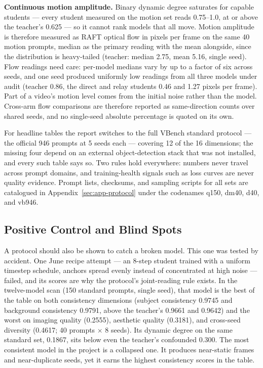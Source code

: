 \documentclass[11pt,a4paper]{article}
\begin{document}
\textbf{Continuous motion amplitude.} Binary dynamic degree saturates for capable students — every student measured on the motion set reads 0.75–1.0, at or above the teacher's 0.625 — so it cannot rank models that all move. Motion amplitude is therefore measured as RAFT optical flow \cite{raft} in pixels per frame on the same 40 motion prompts, median as the primary reading with the mean alongside, since the distribution is heavy-tailed (teacher: median 2.75, mean 5.16, single seed). Flow readings need care: per-model medians vary by up to a factor of six across seeds, and one seed produced uniformly low readings from all three models under audit (teacher 0.86, the direct and relay students 0.46 and 1.27 pixels per frame). Part of a video's motion level comes from the initial noise rather than the model. Cross-arm flow comparisons are therefore reported as same-direction counts over shared seeds, and no single-seed absolute percentage is quoted on its own.

For headline tables the report switches to the full VBench standard protocol — the official 946 prompts at 5 seeds each — covering 12 of the 16 dimensions; the missing four depend on an external object-detection stack that was not installed, and every such table says so. Two rules hold everywhere: numbers never travel across prompt domains, and training-health signals such as loss curves are never quality evidence. Prompt lists, checksums, and sampling scripts for all sets are catalogued in Appendix~\ref{sec:app-protocol} under the codenames q150, dm40, d40, and vb946.

\subsection{Positive Control and Blind Spots}\label{sec:protocol-control}

A protocol should also be shown to catch a broken model. This one was tested by accident. One June recipe attempt — an 8-step student trained with a uniform timestep schedule, anchors spread evenly instead of concentrated at high noise — failed, and its scores are why the protocol's joint-reading rule exists. In the twelve-model scan (150 standard prompts, single seed), that model is the best of the table on both consistency dimensions (subject consistency 0.9745 and background consistency 0.9791, above the teacher's 0.9661 and 0.9642) and the worst on imaging quality (0.2555), aesthetic quality (0.3181), and cross-seed diversity (0.4617; 40 prompts $\times$ 8 seeds). Its dynamic degree on the same standard set, 0.1867, sits below even the teacher's confounded 0.300. The most consistent model in the project is a collapsed one. It produces near-static frames and near-duplicate seeds, yet it earns the highest consistency scores in the table.
\end{document}
